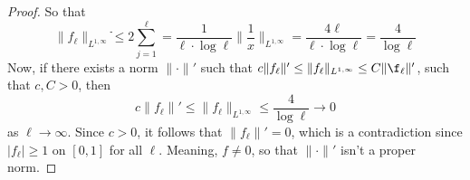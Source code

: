 \documentclass[12pt]{article}
\newenvironment{exercise}[2][Exercise]{\begin{trivlist}
\item[\hskip \labelsep {\bfseries #1}\hskip \labelsep {\bfseries #2.}]}{\end{trivlist}}
\begin{document}
\begin{proof}
  So that
  $$\|f_\ell\|_{L^{1, \infty}} ֿ\le 2 \sum_{j=1}^\ell = \frac{1}{\ell \cdot \log \ell} \|\frac{1}{x}\|_{L^{1, \infty}} = \frac{4 \ell}{\ell \cdot \log \ell} = \frac{4}{\log \ell}$$
  Now, if there exists a norm $\|\cdot\|'$ such that $c\|f_\ell\|' \le \|f_\ell\|_{L^{1, \infty}} \le C\|\f_\ell\|'$, such that $c,C > 0$, then
  $$c\|f_\ell\|' \le \|f_\ell\|_{L^{1, \infty}} \le \dfrac{4}{\log \ell} \rightarrow 0$$
  as $\ell \rightarrow \infty$. Since $c > 0$, it follows that $\|f_\ell\|' = 0$, which is a contradiction since $|f_\ell| \ge 1$ on $[0, 1]$ for all $\ell$. Meaning, $f \ne 0$, so  that $\|\cdot\|'$ isn't a proper  norm.
\end{proof}

\begin{exercise}{3}
\end{exercise}
\end{document}
